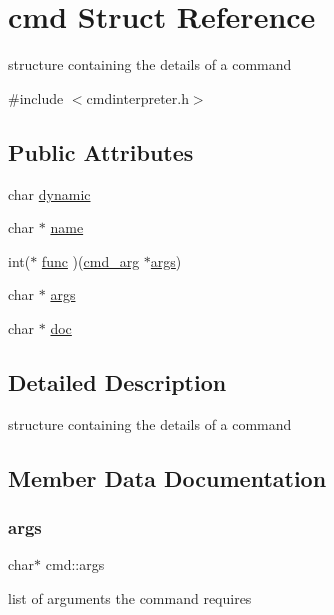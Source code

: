 \hypertarget{structcmd}{}\section{cmd Struct Reference}
\label{structcmd}


structure containing the details of a command  




{\ttfamily \#include $<$cmdinterpreter.\+h$>$}

\subsection*{Public Attributes}
\begin{DoxyCompactItemize}
\item 
char \mbox{\hyperlink{structcmd_a5216a3541afd7bd7c7723dbf00391050}{dynamic}}
\item 
char $\ast$ \mbox{\hyperlink{structcmd_a6ebcb67a0ff2d9a228d6fd6db6bbf1e6}{name}}
\item 
int($\ast$ \mbox{\hyperlink{structcmd_aaaab89491cf3cb6e38cb64e3a6395f19}{func}} )(\mbox{\hyperlink{unioncmd__arg}{cmd\+\_\+arg}} $\ast$\mbox{\hyperlink{structcmd_a1ad1940c47b4b02db1483dfb13f70ad4}{args}})
\item 
char $\ast$ \mbox{\hyperlink{structcmd_a1ad1940c47b4b02db1483dfb13f70ad4}{args}}
\item 
char $\ast$ \mbox{\hyperlink{structcmd_ae204ed15fdf8c24aaab209d091e9bde8}{doc}}
\end{DoxyCompactItemize}


\subsection{Detailed Description}
structure containing the details of a command 

\subsection{Member Data Documentation}
\mbox{\label{structcmd_a1ad1940c47b4b02db1483dfb13f70ad4}} 
\subsubsection{\texorpdfstring{args}{args}}
{\footnotesize\ttfamily char$\ast$ cmd\+::args}

list of arguments the command requires \mbox{\label{structcmd_ae204ed15fdf8c24aaab209d091e9bde8}} 
